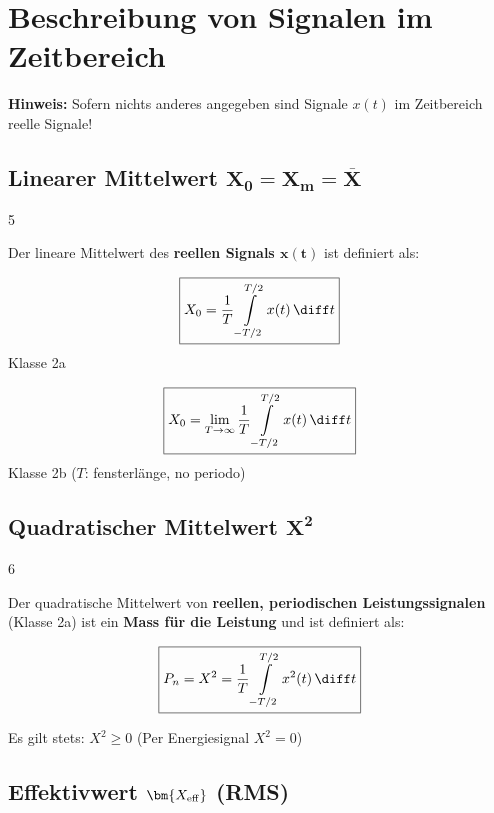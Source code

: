 \section{Beschreibung von Signalen im Zeitbereich}

\textbf{Hinweis:} Sofern nichts anderes angegeben sind Signale $x(t)$ im Zeitbereich reelle Signale!


\subsection[Linearer Mittelwert]{Linearer Mittelwert $\bm{X_0 = X_m = \overline{X}}$}{5}

Der lineare Mittelwert des \textbf{reellen Signals $\bm{x(t)}$} ist definiert als:

\vspace{-0.2cm}

\begin{minipage}[t]{0.48\columnwidth}
    \begin{center}
        $$ \boxed{ X_0 = \frac{1}{T} \int\limits_{-T/2}^{T/2} x(t) \, \diff t } $$
        Klasse 2a
    \end{center}
\end{minipage}
\hfill
\begin{minipage}[t]{0.48\columnwidth}
    \begin{center}
        $$ \boxed{ X_0 = \lim\limits_{T \to \infty} \frac{1}{T} \int\limits_{-T/2}^{T/2} x(t) \, \diff t } $$
        Klasse 2b ($T$: fensterlänge, no periodo)
    \end{center}
\end{minipage}


\subsection[Quadratischer Mittelwert]{Quadratischer Mittelwert $\bm{X^2}$}{6}

Der quadratische Mittelwert von \textbf{\color{red}reellen, periodischen Leistungssignalen} (Klasse 2a) ist ein \textbf{Mass für die Leistung}
und ist definiert als:

$$ \boxed{P_n = X^2 = \frac{1}{T} \int\limits_{-T/2}^{T/2} x^2(t) \, \diff t } $$

Es gilt stets: $X^2 \geq 0$ \qquad \qquad ({\small Per Energiesignal $X^2=0$})


\subsection[Effektivwert (RMS)]{Effektivwert $\bm{X_{\rm eff}}$ (RMS)}

